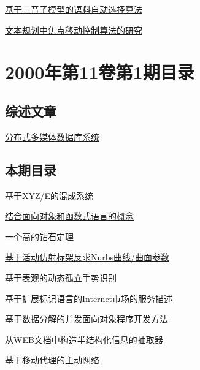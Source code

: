 \documentclass[a4paper]{article}
\begin{document}
\href{http://www.jos.org.cn/ch/reader/download_pdf.aspx?file_no=20000218&year_id=2000&quarter_id=2&falg=1}{基于三音子模型的语料自动选择算法}

\href{http://www.jos.org.cn/ch/reader/download_pdf.aspx?file_no=20000219&year_id=2000&quarter_id=2&falg=1}{文本规划中焦点移动控制算法的研究}


\section{\textbf{2000年第11卷第1期目录}}
\subsection{综述文章}
\href{http://www.jos.org.cn/ch/reader/download_pdf.aspx?file_no=20000104&year_id=2000&quarter_id=1&falg=1}{分布式多媒体数据库系统}

\subsection{本期目录}
\href{http://www.jos.org.cn/ch/reader/download_pdf.aspx?file_no=20000101&year_id=2000&quarter_id=1&falg=1}{基于XYZ/E的混成系统}

\href{http://www.jos.org.cn/ch/reader/download_pdf.aspx?file_no=20000102&year_id=2000&quarter_id=1&falg=1}{结合面向对象和函数式语言的概念}

\href{http://www.jos.org.cn/ch/reader/download_pdf.aspx?file_no=20000103&year_id=2000&quarter_id=1&falg=1}{一个高的钻石定理}

\href{http://www.jos.org.cn/ch/reader/download_pdf.aspx?file_no=20000105&year_id=2000&quarter_id=1&falg=1}{基于活动仿射标架反求Nurbs曲线/曲面参数}

\href{http://www.jos.org.cn/ch/reader/download_pdf.aspx?file_no=20000106&year_id=2000&quarter_id=1&falg=1}{基于表观的动态孤立手势识别}

\href{http://www.jos.org.cn/ch/reader/download_pdf.aspx?file_no=20000107&year_id=2000&quarter_id=1&falg=1}{基于扩展标记语言的Internet市场的服务描述}

\href{http://www.jos.org.cn/ch/reader/download_pdf.aspx?file_no=20000108&year_id=2000&quarter_id=1&falg=1}{基于数据分解的并发面向对象程序开发方法}

\href{http://www.jos.org.cn/ch/reader/download_pdf.aspx?file_no=20000109&year_id=2000&quarter_id=1&falg=1}{从WEB文档中构造半结构化信息的抽取器}

\href{http://www.jos.org.cn/ch/reader/download_pdf.aspx?file_no=20000110&year_id=2000&quarter_id=1&falg=1}{基于移动代理的主动网络}
\end{document}
